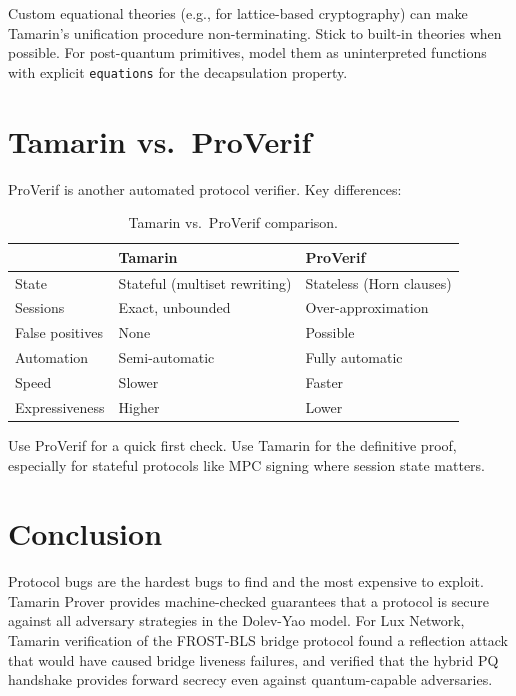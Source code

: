 \documentclass[11pt,a4paper]{article}
\begin{document}
Custom equational theories (e.g., for lattice-based cryptography) can make Tamarin's
unification procedure non-terminating. Stick to built-in theories when possible. For
post-quantum primitives, model them as uninterpreted functions with explicit
\texttt{equations} for the decapsulation property.

\section{Tamarin vs.\ ProVerif}

ProVerif is another automated protocol verifier. Key differences:

\begin{table}[H]
\centering
\small
\begin{tabular}{@{}lll@{}}
\toprule
 & \textbf{Tamarin} & \textbf{ProVerif} \\
\midrule
State & Stateful (multiset rewriting) & Stateless (Horn clauses) \\
Sessions & Exact, unbounded & Over-approximation \\
False positives & None & Possible \\
Automation & Semi-automatic & Fully automatic \\
Speed & Slower & Faster \\
Expressiveness & Higher & Lower \\
\bottomrule
\end{tabular}
\caption{Tamarin vs.\ ProVerif comparison.}
\end{table}

Use ProVerif for a quick first check. Use Tamarin for the definitive proof, especially
for stateful protocols like MPC signing where session state matters.

\section{Conclusion}

Protocol bugs are the hardest bugs to find and the most expensive to exploit. Tamarin
Prover provides machine-checked guarantees that a protocol is secure against all
adversary strategies in the Dolev-Yao model. For Lux Network, Tamarin verification of
the FROST-BLS bridge protocol found a reflection attack that would have caused bridge
liveness failures, and verified that the hybrid PQ handshake provides forward secrecy
even against quantum-capable adversaries.
\end{document}
